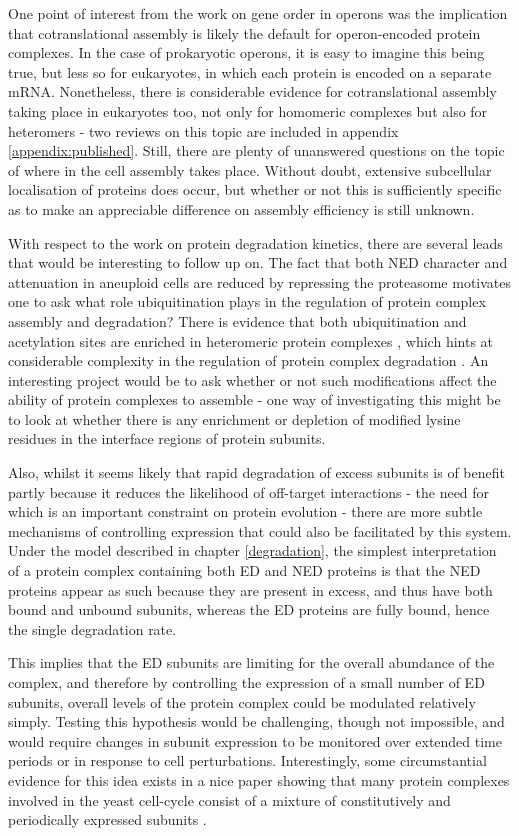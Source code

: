 \documentclass[a4paper,11pt,twoside,openright]{scrbook}
\begin{document}
One point of interest from the work on gene order in operons was the implication that cotranslational assembly is likely the default for operon-encoded protein complexes. In the case of prokaryotic operons, it is easy to imagine this being true, but less so for eukaryotes, in which each protein is encoded on a separate mRNA. Nonetheless, there is considerable evidence for cotranslational assembly taking place in eukaryotes too, not only for homomeric complexes but also for heteromers - two reviews on this topic are included in appendix \ref{appendix:published}. Still, there are plenty of unanswered questions on the topic of where in the cell assembly takes place. Without doubt, extensive subcellular localisation of proteins does occur, but whether or not this is sufficiently specific as to make an appreciable difference on assembly efficiency is still unknown.

With respect to the work on protein degradation kinetics, there are several leads that would be interesting to follow up on. The fact that both NED character and attenuation in aneuploid cells are reduced by repressing the proteasome motivates one to ask what role ubiquitination plays in the regulation of protein complex assembly and degradation? There is evidence that both ubiquitination and acetylation sites are enriched in heteromeric protein complexes \cite{Chen2014,Choudhary2009}, which hints at considerable complexity in the regulation of protein complex degradation \cite{Caron2005}. An interesting project would be to ask whether or not such modifications affect the ability of protein complexes to assemble - one way of investigating this might be to look at whether there is any enrichment or depletion of modified lysine residues in the interface regions of protein subunits.

Also, whilst it seems likely that rapid degradation of excess subunits is of benefit partly because it reduces the likelihood of off-target interactions  - the need for which is an important constraint on protein evolution \cite{Yang2012} - there are more subtle mechanisms of controlling expression that could also be facilitated by this system. Under the model described in chapter \ref{degradation}, the simplest interpretation of a protein complex containing both ED and NED proteins is that the NED proteins appear as such because they are present in excess, and thus have both bound and unbound subunits, whereas the ED proteins are fully bound, hence the single degradation rate.

This implies that the ED subunits are limiting for the overall abundance of the complex, and therefore by controlling the expression of a small number of ED subunits, overall levels of the protein complex could be modulated relatively simply. Testing this hypothesis would be challenging, though not impossible, and would require changes in subunit expression to be monitored over extended time periods or in response to cell perturbations. Interestingly, some circumstantial evidence for this idea exists in a nice paper showing that many protein complexes involved in the yeast cell-cycle consist of a mixture of constitutively and periodically expressed subunits \cite{Lichtenberg2005}.
\end{document}
